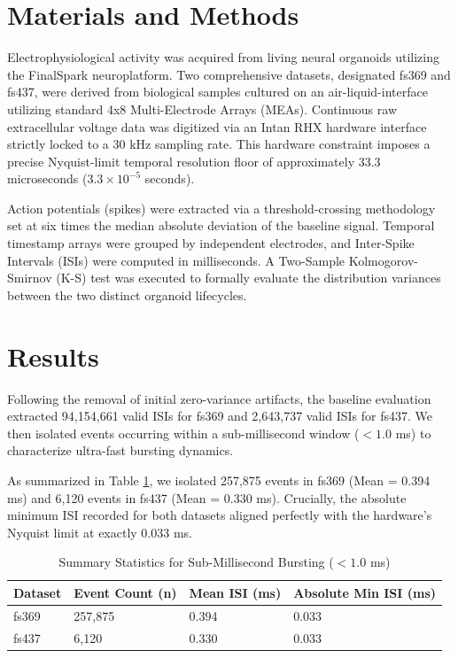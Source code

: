 \documentclass[12pt]{article}
\begin{document}
\section{Materials and Methods}
Electrophysiological activity was acquired from living neural organoids utilizing the FinalSpark neuroplatform. Two comprehensive datasets, designated fs369 and fs437, were derived from biological samples cultured on an air-liquid-interface utilizing standard 4x8 Multi-Electrode Arrays (MEAs). Continuous raw extracellular voltage data was digitized via an Intan RHX hardware interface strictly locked to a 30 kHz sampling rate. This hardware constraint imposes a precise Nyquist-limit temporal resolution floor of approximately 33.3 microseconds ($3.3 \times 10^{-5}$ seconds).

Action potentials (spikes) were extracted via a threshold-crossing methodology set at six times the median absolute deviation of the baseline signal. Temporal timestamp arrays were grouped by independent electrodes, and Inter-Spike Intervals (ISIs) were computed in milliseconds. A Two-Sample Kolmogorov-Smirnov (K-S) test was executed to formally evaluate the distribution variances between the two distinct organoid lifecycles.

\section{Results}
Following the removal of initial zero-variance artifacts, the baseline evaluation extracted 94,154,661 valid ISIs for fs369 and 2,643,737 valid ISIs for fs437. We then isolated events occurring within a sub-millisecond window ($< 1.0$ ms) to characterize ultra-fast bursting dynamics. 

As summarized in Table \ref{tab:stats}, we isolated 257,875 events in fs369 (Mean = 0.394 ms) and 6,120 events in fs437 (Mean = 0.330 ms). Crucially, the absolute minimum ISI recorded for both datasets aligned perfectly with the hardware's Nyquist limit at exactly 0.033 ms.

\begin{table}[h]
\centering
\caption{Summary Statistics for Sub-Millisecond Bursting ($< 1.0$ ms)}
\label{tab:stats}
\begin{tabular}{l l l l}
\toprule
\textbf{Dataset} & \textbf{Event Count (n)} & \textbf{Mean ISI (ms)} & \textbf{Absolute Min ISI (ms)} \\
\midrule
fs369 & 257,875 & 0.394 & 0.033 \\
fs437 & 6,120 & 0.330 & 0.033 \\
\bottomrule
\end{tabular}
\end{table}
\end{document}
